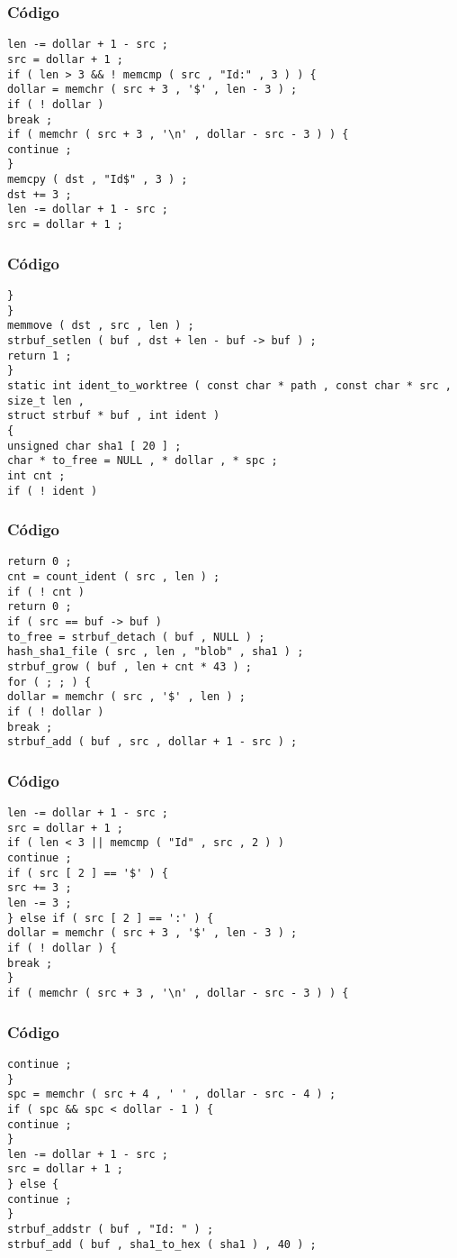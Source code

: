 \documentclass{beamer}
\begin{document}
\begin{frame}[fragile]
\frametitle{C\'odigo}
\begin{verbatim}
len -= dollar + 1 - src ; 
src = dollar + 1 ; 
if ( len > 3 && ! memcmp ( src , "Id:" , 3 ) ) { 
dollar = memchr ( src + 3 , '$' , len - 3 ) ; 
if ( ! dollar ) 
break ; 
if ( memchr ( src + 3 , '\n' , dollar - src - 3 ) ) { 
continue ; 
} 
memcpy ( dst , "Id$" , 3 ) ; 
dst += 3 ; 
len -= dollar + 1 - src ; 
src = dollar + 1 ; 
\end{verbatim}
\end{frame}
\begin{frame}[fragile]
\frametitle{C\'odigo}
\begin{verbatim}
} 
} 
memmove ( dst , src , len ) ; 
strbuf_setlen ( buf , dst + len - buf -> buf ) ; 
return 1 ; 
} 
static int ident_to_worktree ( const char * path , const char * src , size_t len , 
struct strbuf * buf , int ident ) 
{ 
unsigned char sha1 [ 20 ] ; 
char * to_free = NULL , * dollar , * spc ; 
int cnt ; 
if ( ! ident ) 
\end{verbatim}
\end{frame}
\begin{frame}[fragile]
\frametitle{C\'odigo}
\begin{verbatim}
return 0 ; 
cnt = count_ident ( src , len ) ; 
if ( ! cnt ) 
return 0 ; 
if ( src == buf -> buf ) 
to_free = strbuf_detach ( buf , NULL ) ; 
hash_sha1_file ( src , len , "blob" , sha1 ) ; 
strbuf_grow ( buf , len + cnt * 43 ) ; 
for ( ; ; ) { 
dollar = memchr ( src , '$' , len ) ; 
if ( ! dollar ) 
break ; 
strbuf_add ( buf , src , dollar + 1 - src ) ; 
\end{verbatim}
\end{frame}
\begin{frame}[fragile]
\frametitle{C\'odigo}
\begin{verbatim}
len -= dollar + 1 - src ; 
src = dollar + 1 ; 
if ( len < 3 || memcmp ( "Id" , src , 2 ) ) 
continue ; 
if ( src [ 2 ] == '$' ) { 
src += 3 ; 
len -= 3 ; 
} else if ( src [ 2 ] == ':' ) { 
dollar = memchr ( src + 3 , '$' , len - 3 ) ; 
if ( ! dollar ) { 
break ; 
} 
if ( memchr ( src + 3 , '\n' , dollar - src - 3 ) ) { 
\end{verbatim}
\end{frame}
\begin{frame}[fragile]
\frametitle{C\'odigo}
\begin{verbatim}
continue ; 
} 
spc = memchr ( src + 4 , ' ' , dollar - src - 4 ) ; 
if ( spc && spc < dollar - 1 ) { 
continue ; 
} 
len -= dollar + 1 - src ; 
src = dollar + 1 ; 
} else { 
continue ; 
} 
strbuf_addstr ( buf , "Id: " ) ; 
strbuf_add ( buf , sha1_to_hex ( sha1 ) , 40 ) ; 
\end{verbatim}
\end{frame}
\end{document}
